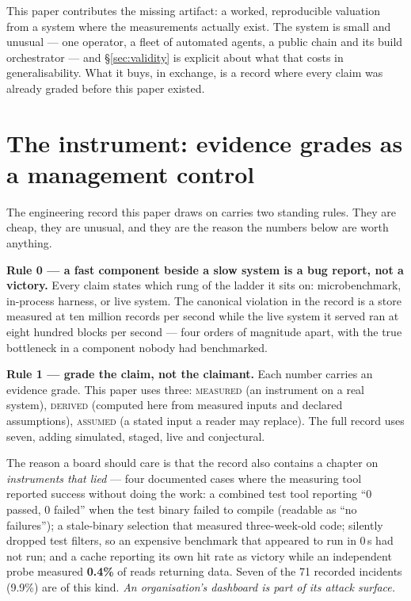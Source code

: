 \documentclass[11pt,a4paper]{article}
\newcommand{\measured}[1]{\textcolor{sigilcyan}{\textbf{#1}}}
\begin{document}
This paper contributes the missing artifact: a worked, reproducible valuation from a system where the measurements actually exist. The system is small and unusual --- one operator, a fleet of automated agents, a public chain and its build orchestrator --- and \S\ref{sec:validity} is explicit about what that costs in generalisability. What it buys, in exchange, is a record where every claim was already graded before this paper existed.


\section{The instrument: evidence grades as a management control}\label{sec:instrument}


The engineering record this paper draws on carries two standing rules. They are cheap, they are unusual, and they are the reason the numbers below are worth anything.


\textbf{Rule 0 --- a fast component beside a slow system is a bug report, not a victory.} Every claim states which rung of the ladder it sits on: microbenchmark, in-process harness, or live system. The canonical violation in the record is a store measured at ten million records per second while the live system it served ran at eight hundred blocks per second --- four orders of magnitude apart, with the true bottleneck in a component nobody had benchmarked.


\textbf{Rule 1 --- grade the claim, not the claimant.} Each number carries an evidence grade. This paper uses three: \textsc{measured} (an instrument on a real system), \textsc{derived} (computed here from measured inputs and declared assumptions), \textsc{assumed} (a stated input a reader may replace). The full record uses seven, adding simulated, staged, live and conjectural.


The reason a board should care is that the record also contains a chapter on \emph{instruments that lied} --- four documented cases where the measuring tool reported success without doing the work: a combined test tool reporting ``0 passed, 0 failed'' when the test binary failed to compile (readable as ``no failures''); a stale-binary selection that measured three-week-old code; silently dropped test filters, so an expensive benchmark that appeared to run in 0\,s had not run; and a cache reporting its own hit rate as victory while an independent probe measured \measured{0.4\%} of reads returning data. Seven of the 71 recorded incidents (9.9\%) are of this kind. \emph{An organisation's dashboard is part of its attack surface.}
\end{document}
